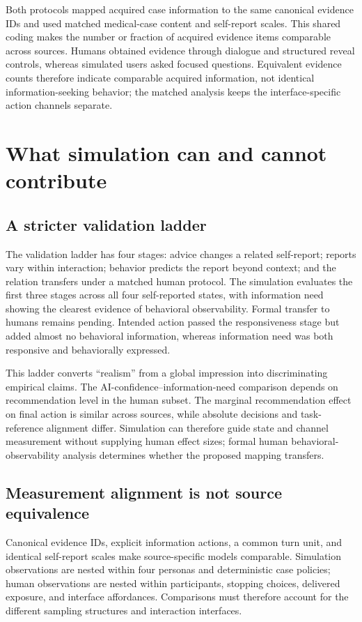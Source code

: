 \documentclass{article}
\begin{document}
Both protocols mapped acquired case information to the same canonical evidence IDs and used matched medical-case content and self-report scales. This shared coding makes the number or fraction of acquired evidence items comparable across sources. Humans obtained evidence through dialogue and structured reveal controls, whereas simulated users asked focused questions. Equivalent evidence counts therefore indicate comparable acquired information, not identical information-seeking behavior; the matched analysis keeps the interface-specific action channels separate.

\section{What simulation can and cannot contribute}
\subsection{A stricter validation ladder}

The validation ladder has four stages: advice changes a related self-report; reports vary within interaction; behavior predicts the report beyond context; and the relation transfers under a matched human protocol. The simulation evaluates the first three stages across all four self-reported states, with information need showing the clearest evidence of behavioral observability. Formal transfer to humans remains pending. Intended action passed the responsiveness stage but added almost no behavioral information, whereas information need was both responsive and behaviorally expressed.

This ladder converts ``realism'' from a global impression into discriminating empirical claims. The AI-confidence--information-need comparison depends on recommendation level in the human subset. The marginal recommendation effect on final action is similar across sources, while absolute decisions and task-reference alignment differ. Simulation can therefore guide state and channel measurement without supplying human effect sizes; formal human behavioral-observability analysis determines whether the proposed mapping transfers.

\subsection{Measurement alignment is not source equivalence}

Canonical evidence IDs, explicit information actions, a common turn unit, and identical self-report scales make source-specific models comparable. Simulation observations are nested within four personas and deterministic case policies; human observations are nested within participants, stopping choices, delivered exposure, and interface affordances. Comparisons must therefore account for the different sampling structures and interaction interfaces.
\end{document}
